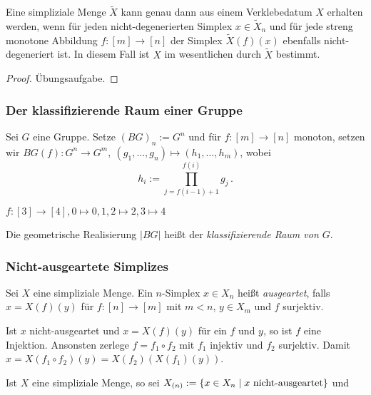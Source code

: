 \begin{prop}
  Eine simpliziale Menge $\tilde X$ kann genau dann aus einem Verklebedatum $X$
  erhalten werden, wenn für jeden nicht-degenerierten Simplex $x \in \tilde
  X_n$ und für jede streng monotone Abbildung $f:[m]\to [n]$ der Simplex
  $\tilde X(f)(x)$ ebenfalls nicht-degeneriert ist. In diesem Fall ist $X$ im
  wesentlichen durch $\tilde X$ bestimmt.
\end{prop}
\begin{proof}
  Übungsaufgabe.
\end{proof}

\subsubsection{Der klassifizierende Raum einer Gruppe}
Sei $G$ eine Gruppe. Setze $(BG)_n := G^n$ und für $f:[m]\to[n]$ monoton,
setzen wir $BG(f): G^n\to G^m,\ (g_1,\ldots,g_n)\mapsto (h_1,\ldots,h_m)$,
wobei
\[ h_i := \prod_{j = f(i-1)+1}^{f(i)} g_j\,.\]


\begin{beispiel}
  $f: [3]\to[4], 0\mapsto 0, 1,2\mapsto 2, 3\mapsto 4$ 
  \Bild
\end{beispiel}

\begin{definition}
  Die geometrische Realisierung $|BG|$ heißt der \emph{klassifizierende Raum
  von $G$}.
\end{definition}


\subsubsection{Nicht-ausgeartete Simplizes}
\label{subsub:nicht_ausgeartet}
\begin{definition}
  Sei $X$ eine simpliziale Menge. Ein $n$-Simplex $x \in X_n$ heißt 
  \emph{ausgeartet}, falls $x = X(f)(y)$ für $f:[n]\to[m]$ mit $m<n$,
  $y\in X_m$ und $f$ surjektiv.
\end{definition}

\begin{bem}
  Ist $x$ nicht-ausgeartet und $x = X(f)(y)$ für ein $f$ und $y$, so ist
  $f$ eine Injektion. Ansonsten zerlege $f = f_1\circ f_2$ mit $f_1$ injektiv
  und $f_2$ surjektiv. Damit $x = X(f_1\circ f_2)(y) = X(f_2)(X(f_1)(y))$.
\end{bem}

Ist $X$ eine simpliziale Menge, so sei 
$X_{(n)} := \{ x\in X_n \mid x\text{ nicht-ausgeartet}\}$ und
\begin{center}
\end{center}

